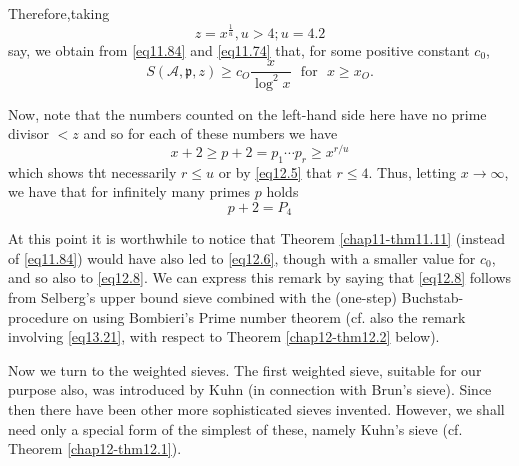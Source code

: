 Therefore,\pageoriginale taking
\begin{equation*}
z= x^{\frac{1}{u}}, u >4 ; u = 4.2\tag{12.5}\label{eq12.5}
\end{equation*}  
say, we obtain from \eqref{eq11.84} and \eqref{eq11.74} that, for some
positive constant $c_0$,	 
\begin{equation*}
S(\mathscr {A}, \mathfrak{p} ,z) \ge c_O \frac{x}{\log ^2 x}\text{~
  for~ } x \ge x_O . \tag{12.6}\label{eq12.6} 
\end{equation*}  
  
Now, note that the numbers counted on the left-hand side here have no
prime divisor $< z$ and so for each of these numbers we have  
\begin{equation*}
x+2 \ge p + 2 = p_1 \cdots p_r \ge x^{r/u} \tag{12.7}\label{eq12.7}
\end{equation*} 
which shows tht necessarily $r\leq u $ or by \eqref{eq12.5} that $r
\leq 4$. Thus, letting $x \rightarrow \infty $, we have that for
infinitely many primes $p$ holds  
\begin{equation*}
   p+2 = P_4 \tag{12.8}\label{eq12.8}
\end{equation*}   
  
At this point it is worthwhile to notice that Theorem
\ref{chap11-thm11.11} (instead 
of \eqref{eq11.84}) would have also led to \eqref{eq12.6}, though with
a smaller value for $c_0$, and so also to \eqref{eq12.8}.  We can
express this remark 
by saying that \eqref{eq12.8} follows from Selberg's upper bound sieve
combined with the (one-step) Buchstab-procedure on using
Bombieri's Prime number theorem (cf. also the remark involving
\eqref{eq13.21}, with respect to Theorem \ref{chap12-thm12.2}  below). 

Now we turn to the weighted  sieves. The first weighted sieve,
suitable for our purpose also, was introduced by Kuhn (in connection
with Brun's sieve).  Since then there have been  other more
sophisticated sieves invented. However, we shall need only a special
form of the simplest of these, namely Kuhn's sieve (cf. Theorem
\ref{chap12-thm12.1}). 

